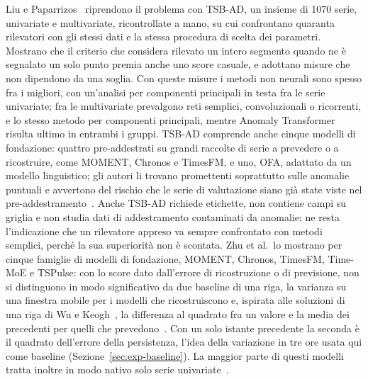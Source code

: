 Liu e Paparrizos~\cite{liu2024elephant} riprendono il problema con TSB-AD, un insieme di 1070 serie, univariate e multivariate, ricontrollate a mano, su cui confrontano quaranta rilevatori con gli stessi dati e la stessa procedura di scelta dei parametri. Mostrano che il criterio che considera rilevato un intero segmento quando ne è segnalato un solo punto premia anche uno score casuale, e adottano misure che non dipendono da una soglia. Con queste misure i metodi non neurali sono spesso fra i migliori, con un'analisi per componenti principali in testa fra le serie univariate; fra le multivariate prevalgono reti semplici, convoluzionali o ricorrenti, e lo stesso metodo per componenti principali, mentre Anomaly Transformer risulta ultimo in entrambi i gruppi. TSB-AD comprende anche cinque modelli di fondazione: quattro pre-addestrati su grandi raccolte di serie a prevedere o a ricostruire, come MOMENT, Chronos e TimesFM, e uno, OFA, adattato da un modello linguistico; gli autori li trovano promettenti soprattutto sulle anomalie puntuali e avvertono del rischio che le serie di valutazione siano già state viste nel pre-addestramento~\cite{liu2024elephant}. Anche TSB-AD richiede etichette, non contiene campi su griglia e non studia dati di addestramento contaminati da anomalie; ne resta l'indicazione che un rilevatore appreso va sempre confrontato con metodi semplici, perché la sua superiorità non è scontata. Zhu et al.\ lo mostrano per cinque famiglie di modelli di fondazione, MOMENT, Chronos, TimesFM, Time-MoE e TSPulse: con lo score dato dall'errore di ricostruzione o di previsione, non si distinguono in modo significativo da due baseline di una riga, la varianza su una finestra mobile per i modelli che ricostruiscono e, ispirata alle soluzioni di una riga di Wu e Keogh~\cite{wu2021flawed}, la differenza al quadrato fra un valore e la media dei precedenti per quelli che prevedono~\cite{zhu2026oneliners}. Con un solo istante precedente la seconda è il quadrato dell'errore della persistenza, l'idea della variazione in tre ore usata qui come baseline (Sezione~\ref{sec:exp-baseline}). La maggior parte di questi modelli tratta inoltre in modo nativo solo serie univariate~\cite{zhu2026oneliners}.

